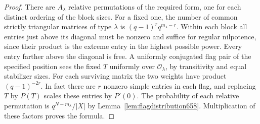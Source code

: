 \documentclass[a4paper,11pt]{article}
\theoremstyle{definition}
\theoremstyle{remark}
\numberwithin{equation}{section}
\begin{document}
\begin{proof}
There are \(A_\lambda\) relative permutations of the required
form, one for each distinct ordering of the block sizes. For a
fixed one, the number of common strictly triangular matrices
of type \(\lambda\) is
\((q-1)^r q^{m_\lambda-r}\). Within each block all entries just
above its diagonal must be nonzero and suffice for regular
nilpotence, since their product is the extreme entry in the
highest possible power. Every entry farther above the diagonal
is free. A uniformly conjugated flag pair of the specified
position sees the fixed \(T\) uniformly over \(\mathcal O_\lambda\),
by transitivity and equal stabilizer sizes. For each surviving
matrix the two weights have product \((q-1)^{-2r}\). In fact
there are \(r\) nonzero simple entries in each flag, and replacing
\(T\) by \(P(T)\) scales these entries by \(P'(0)\).
The probability of each relative permutation is
\(q^{N-m_\lambda}/|X|\) by Lemma~\ref{lem:flagdistribution658}.
Multiplication of these factors proves the formula.
\end{proof}
\end{document}

